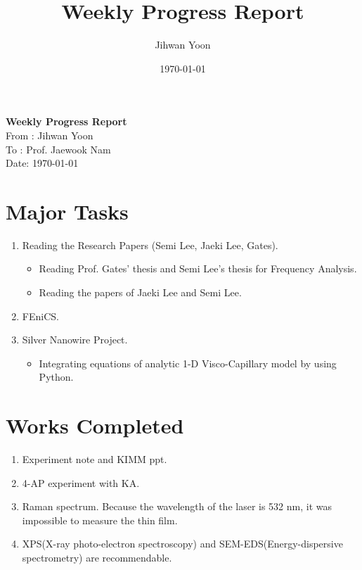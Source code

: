 \documentclass{article}
\title{Weekly Progress Report}
\author{Jihwan Yoon}
\date{\today}
\begin{document}
\begin{center}
 {\LARGE \bf Weekly Progress Report}\\[15pt]
 {\Large From : Jihwan Yoon\\[5pt]  To : Prof. Jaewook Nam\\[10pt] Date: \today}\\[30pt]
\end{center}


\section{Major Tasks}
\begin{enumerate}
 \item Reading the Research Papers (Semi Lee, Jaeki Lee, Gates).
       \begin{itemize}
        \item Reading Prof. Gates' thesis\cite{gates1999slot} and Semi Lee's thesis for Frequency Analysis.
        \item Reading the papers of Jaeki Lee\cite{lee2016simple} and Semi Lee\cite{lee2015analysis}.
       \end{itemize}
 \item FEniCS.
 \item Silver Nanowire Project.
       \begin{itemize}
        \item Integrating equations of analytic 1-D Visco-Capillary model by using Python.
       \end{itemize}
\end{enumerate}
\vspace{5mm}


\section{Works Completed}
\begin{enumerate}
\item Experiment note and KIMM ppt.
 \item 4-AP experiment with KA.
 \item Raman spectrum. Because the wavelength of the laser is 532 nm, it was impossible to measure the thin film.
 \item XPS(X-ray photo-electron spectroscopy) and SEM-EDS(Energy-dispersive spectrometry) are recommendable. 
\end{enumerate}


\vspace{5mm}
\end{document}
